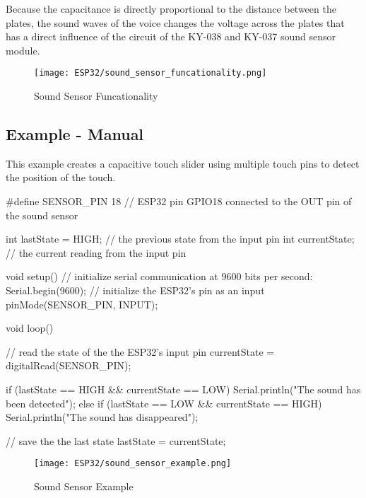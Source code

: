 Because the capacitance is directly proportional to the distance between the plates, the sound waves of the voice changes the voltage across the plates that has a direct influence of the circuit of the KY-038 and KY-037 sound sensor module.

\begin{figure}  
	\begin{center}
		\texttt{[image: ESP32/sound\_sensor\_funcationality.png]}
		\caption{Sound Sensor Funcationality} 
		\label{fig:Python 3.10.}
	\end{center}
\end{figure}	


\subsection{Example - Manual}

This example creates a capacitive touch slider using multiple touch pins to detect the position of the touch.


\begin{Arduino}

	
	#define SENSOR_PIN 18 // ESP32 pin GPIO18 connected to the OUT pin of the sound sensor
	
	int lastState = HIGH;  // the previous state from the input pin
	int currentState;      // the current reading from the input pin
	
	void setup() {
		// initialize serial communication at 9600 bits per second:
		Serial.begin(9600);
		// initialize the ESP32's pin as an input
		pinMode(SENSOR_PIN, INPUT);
	}
	
	void loop() {
		// read the state of the the ESP32's input pin
		currentState = digitalRead(SENSOR_PIN);
		
		if (lastState == HIGH && currentState == LOW)
		Serial.println("The sound has been detected");
		else if (lastState == LOW && currentState == HIGH)
		Serial.println("The sound has disappeared");
		
		// save the the last state
		lastState = currentState;
	}
	
	
	
	
\end{Arduino}


\begin{figure}  
	\begin{center}
		\texttt{[image: ESP32/sound\_sensor\_example.png]}
		\caption{Sound Sensor Example} 
		\label{fig:Python 3.10.}
	\end{center}
\end{figure}	


